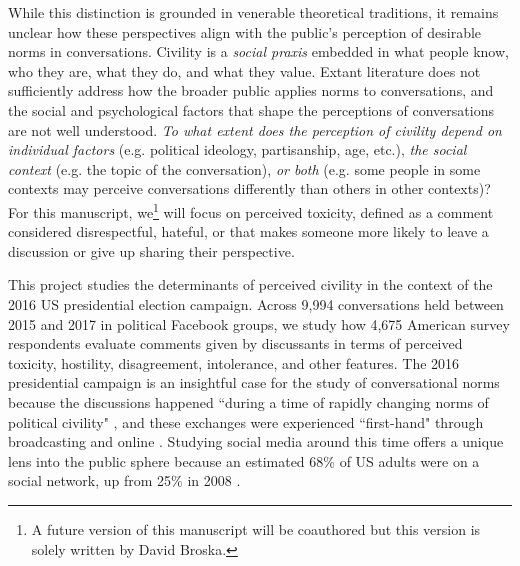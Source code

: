\documentclass{article}
\begin{document}
While this distinction is grounded in venerable theoretical traditions, it remains unclear how these perspectives align with the public's perception of desirable norms in conversations. Civility is a \textit{social praxis} embedded in what people know, who they are, what they do, and what they value. Extant literature does not sufficiently address how the broader public applies norms to conversations, and the social and psychological factors that shape the perceptions of conversations are not well understood. \textit{To what extent does the perception of civility depend on individual factors} (e.g. political ideology, partisanship, age, etc.), \textit{the social context} (e.g. the topic of the conversation), \textit{or both} (e.g. some people in some contexts may perceive conversations differently than others in other contexts)? For this manuscript, we\footnote{A future version of this manuscript will be coauthored but this version is solely written by David Broska.} will focus on perceived toxicity, defined as a comment considered disrespectful, hateful, or that makes someone more likely to leave a discussion or give up sharing their perspective. 

This project studies the determinants of perceived civility in the context of the 2016 US presidential election campaign. Across 9,994 conversations held between 2015 and 2017 in political Facebook groups, we study how 4,675 American survey respondents evaluate comments given by discussants in terms of perceived toxicity, hostility, disagreement, intolerance, and other features. The 2016 presidential campaign is an insightful case for the study of conversational norms because the discussions happened ``during a time of rapidly changing norms of political civility" \citep{munger_dont_2021}, and these exchanges were experienced ``first-hand" through broadcasting and online \citep{mutz_inyourface_2016}. Studying social media around this time offers a unique lens into the public sphere because an estimated 68\% of US adults were on a social network, up from 25\% in 2008 \citep{duggan_social_2016}.

\end{document}
